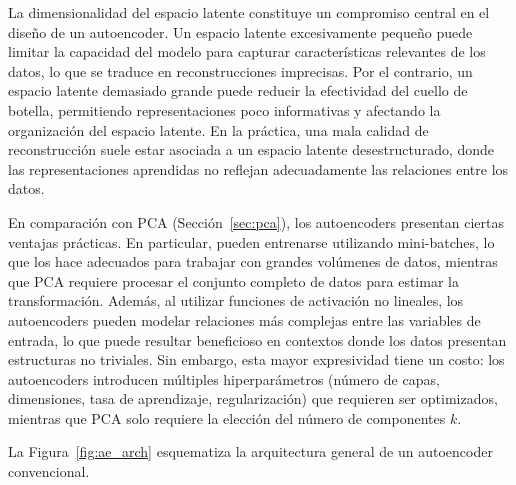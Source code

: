 La dimensionalidad del espacio latente constituye un compromiso central en el diseño de un autoencoder. Un espacio latente excesivamente pequeño puede limitar la capacidad del modelo para capturar características relevantes de los datos, lo que se traduce en reconstrucciones imprecisas. Por el contrario, un espacio latente demasiado grande puede reducir la efectividad del cuello de botella, permitiendo representaciones poco informativas y afectando la organización del espacio latente. En la práctica, una mala calidad de reconstrucción suele estar asociada a un espacio latente desestructurado, donde las representaciones aprendidas no reflejan adecuadamente las relaciones entre los datos.

En comparación con PCA (Sección~\ref{sec:pca}), los autoencoders presentan ciertas ventajas prácticas. En particular, pueden entrenarse utilizando mini-batches, lo que los hace adecuados para trabajar con grandes volúmenes de datos, mientras que PCA requiere procesar el conjunto completo de datos para estimar la transformación. Además, al utilizar funciones de activación no lineales, los autoencoders pueden modelar relaciones más complejas entre las variables de entrada, lo que puede resultar beneficioso en contextos donde los datos presentan estructuras no triviales. Sin embargo, esta mayor expresividad tiene un costo: los autoencoders introducen múltiples hiperparámetros (número de capas, dimensiones, tasa de aprendizaje, regularización) que requieren ser optimizados, mientras que PCA solo requiere la elección del número de componentes $k$.

La Figura~\ref{fig:ae_arch} esquematiza la arquitectura general de un autoencoder convencional.

